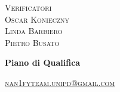 \documentclass[8pt]{article}
\begin{document}
\begin{titlepage}
\begin{minipage}[t]{0.47\textwidth}
		{\large{\textsc{Verificatori}}
			\vspace{3mm}
			{\\\large{\textsc{Oscar Konieczny}\\}} 
			{\large{\textsc{Linda Barbiero}\\}} 
			{\large{\textsc{Pietro Busato}\\}}
			
		}
		\vspace{2mm}\vspace{2mm}
	\end{minipage}
	\vspace{4cm}
	\begin{center}
		\begin{flushright}
			{\fontsize{30pt}{52pt}\selectfont \textbf{Piano di Qualifica}} %
		\end{flushright}
		\vspace{3cm}
	\end{center}
	\vspace{10 cm}
	{\small \textsc{\href{mailto: nan1fyteam.unipd@gmail.com}{nan1fyteam.unipd@gmail.com}}}
\end{titlepage}
\pagestyle{mystyle}
\end{document}

